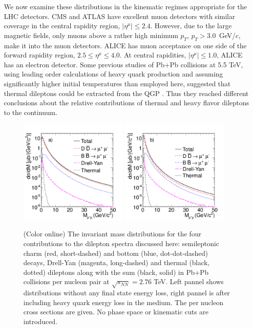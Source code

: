 We now examine these distributions in the kinematic regimes appropriate for the
LHC detectors. CMS \cite{CMS} and ATLAS \cite{ATLAS} have excellent muon 
detectors with similar coverage  in the central rapidity region, 
$|\eta^{\mu}| \leq 2.4$. However, due to the large magnetic fields, only muons
above a rather high minimum $p_T$, $p_T > 3.0$~GeV/$c$, make it into the muon 
detectors.  ALICE \cite{ALICE} has muon acceptance on one side of the forward 
rapidity region, $2.5 \leq \eta^{\mu} \leq 4.0$.  At central rapidities,
$|\eta^{\mu}| \leq 1.0$, ALICE has an electron detector.  Some previous studies
of Pb+Pb collisions at 5.5 TeV, using leading order calculations of heavy quark
production and assuming significantly higher initial temperatures than employed 
here, suggested that thermal dileptons could be extracted from the QGP  
\cite{GALL}. Thus they reached different conclusions about the 
relative contributions of thermal and heavy flavor dileptons to the continuum.

\begin{figure}
\includegraphics[width=0.48\textwidth]{chap_DiMuonContinuum_figures/Fig6a_NoLossAll}
\includegraphics[width=0.48\textwidth]{chap_DiMuonContinuum_figures/Fig6b_ELossAll}

\caption{(Color online)
The invariant mass distributions for the four contributions to the 
dilepton spectra discussed here: semileptonic charm (red, short-dashed) 
and bottom (blue, dot-dot-dashed) decays, Drell-Yan (magenta, 
long-dashed) and thermal (black, dotted) dileptons along with the sum (black,
solid) in Pb+Pb collisions per nucleon pair
at $\sqrt {s_{NN}}=2.76$ TeV. Left pannel shows distributions without any
final state energy loss, right pannel is after including heavy quark energy loss 
in the medium. The per nucleon cross sections are given.
No phase space or kinematic cuts are introduced.
}
\label{DiLepAll}
\end{figure}



